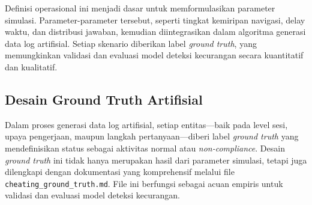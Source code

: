 Definisi operasional ini menjadi dasar untuk memformulasikan parameter simulasi. Parameter-parameter tersebut, seperti tingkat kemiripan navigasi, delay waktu, dan distribusi jawaban, kemudian diintegrasikan dalam algoritma generasi data log artifisial. Setiap skenario diberikan label \textit{ground truth}, yang memungkinkan validasi dan evaluasi model deteksi kecurangan secara kuantitatif dan kualitatif.

\subsection{Desain Ground Truth Artifisial}
\label{sec:desainGroundTruthArtifisial}
Dalam proses generasi data log artifisial, setiap entitas---baik pada level sesi, upaya pengerjaan, maupun langkah pertanyaan---diberi label \textit{ground truth} yang mendefinisikan status sebagai aktivitas normal atau \textit{non-compliance}. Desain \textit{ground truth} ini tidak hanya merupakan hasil dari parameter simulasi, tetapi juga dilengkapi dengan dokumentasi yang komprehensif melalui file \texttt{cheating\_ground\_truth.md}. File ini berfungsi sebagai acuan empiris untuk validasi dan evaluasi model deteksi kecurangan.

